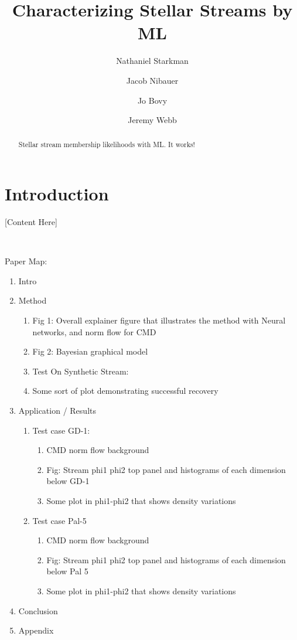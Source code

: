\documentclass[twocolumn]{aastex631}
\begin{document}
\title{Characterizing Stellar Streams by ML}

\author{Nathaniel Starkman}
\author{Jacob Nibauer}
\author{Jo Bovy}
\author{Jeremy Webb}

\begin{abstract}
    Stellar stream membership likelihoods with ML. It works!
\end{abstract}

\section{Introduction} \label{sec:intro}

    [Content Here]

    \

    Paper Map:
    \begin{enumerate}
        \item Intro
        \item Method \begin{enumerate}
            \item Fig 1: Overall explainer figure that illustrates the method with Neural networks, and norm flow for CMD
            \item Fig 2: Bayesian graphical model
            \item Test On Synthetic Stream:
            \item Some sort of plot demonstrating successful recovery
        \end{enumerate}
        \item Application / Results \begin{enumerate}
            \item Test case GD-1: \begin{enumerate}
                \item CMD norm flow background
                \item Fig: Stream phi1 phi2 top panel and histograms of each dimension below GD-1
                \item Some plot in phi1-phi2 that shows density variations
            \end{enumerate}
            \item Test case Pal-5 \begin{enumerate}
                \item CMD norm flow background
                \item Fig: Stream phi1 phi2 top panel and histograms of each dimension below Pal 5
                \item Some plot in phi1-phi2 that shows density variations
            \end{enumerate}
        \end{enumerate}
        \item Conclusion
        \item Appendix
    \end{enumerate}
\end{document}
